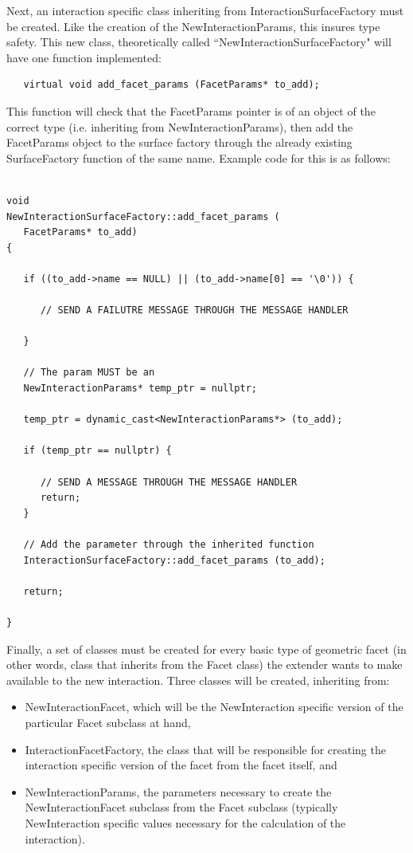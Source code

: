 Next, an interaction specific class inheriting from
InteractionSurfaceFactory must be created. Like the creation of the
NewInteractionParams, this insures type safety. This new class,
theoretically called ``NewInteractionSurfaceFactory" will have one
function implemented:

\begin{verbatim}
   virtual void add_facet_params (FacetParams* to_add);
\end{verbatim}

This function will check that the FacetParams pointer is of an object
of the correct type (i.e. inheriting from NewInteractionParams), then
add the FacetParams object to the surface factory through the already
existing SurfaceFactory function of the same name. Example code
for this is as follows:

\begin{verbatim}

void
NewInteractionSurfaceFactory::add_facet_params (
   FacetParams* to_add)
{

   if ((to_add->name == NULL) || (to_add->name[0] == '\0')) {

      // SEND A FAILUTRE MESSAGE THROUGH THE MESSAGE HANDLER

   }

   // The param MUST be an
   NewInteractionParams* temp_ptr = nullptr;

   temp_ptr = dynamic_cast<NewInteractionParams*> (to_add);

   if (temp_ptr == nullptr) {

      // SEND A MESSAGE THROUGH THE MESSAGE HANDLER
      return;
   }

   // Add the parameter through the inherited function
   InteractionSurfaceFactory::add_facet_params (to_add);

   return;

}
\end{verbatim}

Finally, a set of classes must be created for every basic type of geometric facet
(in other words, class that inherits from the Facet class) the extender
wants to make available to the new interaction. Three classes will be created,
inheriting from:

\begin{itemize}
\item{NewInteractionFacet}, which will be the NewInteraction specific version
of the particular Facet subclass at hand,
\item{InteractionFacetFactory}, the class that will be responsible for creating
the interaction specific version of the facet from the facet itself, and
\item{NewInteractionParams}, the parameters necessary to create the
NewInteractionFacet subclass from the Facet subclass (typically NewInteraction
specific values necessary for the calculation of the interaction).
\end{itemize}

